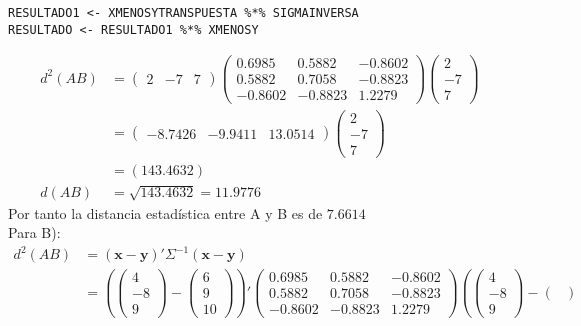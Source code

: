 \begin{sol}
\begin{verbatim}
RESULTADO1 <- XMENOSYTRANSPUESTA %*% SIGMAINVERSA
RESULTADO <- RESULTADO1 %*% XMENOSY
\end{verbatim}
\begin{align*}d^2(AB) &=
\begin{pmatrix}
2&-7&7\end{pmatrix}
\begin{pmatrix}
0.6985 &  0.5882 & -0.8602 \\
0.5882 & 0.7058 & -0.8823  \\
-0.8602 & -0.8823 & 1.2279
\end{pmatrix}
\begin{pmatrix}
2\\-7\\7
\end{pmatrix}\\
&= \begin{pmatrix}
-8.7426 & -9.9411 & 13.0514
\end{pmatrix}\begin{pmatrix}
2\\-7\\7
\end{pmatrix}\\
&= (143.4632)\\
d(AB) &= \sqrt{143.4632}=11.9776
\end{align*}
Por tanto la distancia estadística entre A y B es de $7.6614$\\
Para B):
\begin{align*}
d^2(AB) &= (\mathbf{x}-\mathbf{y})' \Sigma^{-1} (\mathbf{x}-\mathbf{y})\\
&= 
\left( \begin{pmatrix}
4 \\ -8 \\ 9
\end{pmatrix}- 
\begin{pmatrix}
6\\9\\10
\end{pmatrix} \right)'
\begin{pmatrix}
0.6985 &  0.5882 & -0.8602 \\
0.5882 & 0.7058 & -0.8823  \\
-0.8602 & -0.8823 & 1.2279
\end{pmatrix}
\left( \begin{pmatrix}
4 \\ -8 \\ 9
\end{pmatrix}- 
\begin{pmatrix}

\end{pmatrix}
\end{align*}
\end{sol}
